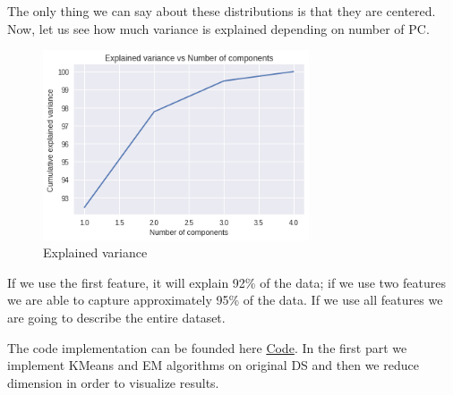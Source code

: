 \documentclass{homework}
\begin{document}
The only thing we can say about these distributions is that they are centered. Now, let us see how much variance is explained depending on number of PC.
\begin{figure}[hbt!]
	\centering
	\includegraphics[width=0.7\textwidth]{explained_variance.png}
	\caption{Explained variance}
\end{figure}

If we use the first feature, it will explain 92\% of the data; if we use two features we are able to capture approximately 95\% of the data. If we use all features we are going to describe the entire dataset.

The code implementation can be founded here \href{https://colab.research.google.com/drive/1x69gkP0C4YcYL_MKZ25hrghFE2HcYUKP?usp=sharing}{Code}.
In the first part we implement KMeans and EM algorithms on original DS and then we reduce dimension in order to visualize results.
\end{document}
